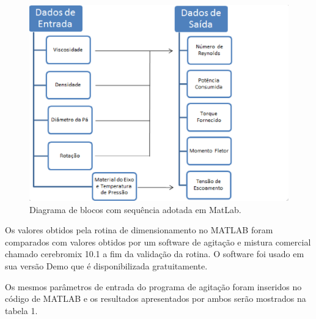 \begin{figure}[h]
 \centering
 \includegraphics[keepaspectratio=true,scale=0.4]{figuras/blocos.eps}
 \caption{Diagrama de blocos com sequência adotada em MatLab.}
 \label{blocos}
\end{figure}

Os valores obtidos pela rotina de dimensionamento no MATLAB foram comparados com valores obtidos por um software de agitação e mistura comercial chamado cerebromix 10.1 a fim da validação da rotina. O software foi usado em sua versão Demo que é disponibilizada gratuitamente.

Os mesmos parâmetros de entrada do programa de agitação foram inseridos no código de MATLAB e os resultados apresentados por ambos serão mostrados na tabela 1.
